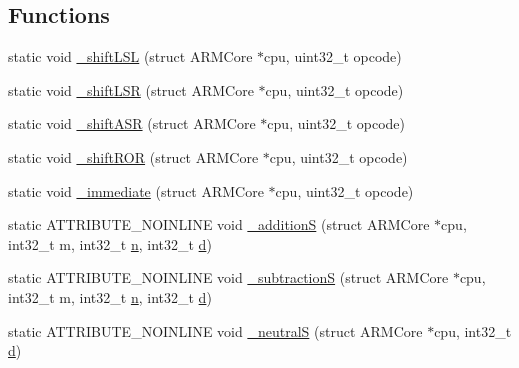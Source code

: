 \subsection*{Functions}
\begin{DoxyCompactItemize}
\item 
static void \mbox{\hyperlink{isa-arm_8c_a8d2da5536596dafb6d1b701db5ac6eca}{\+\_\+shift\+L\+SL}} (struct A\+R\+M\+Core $\ast$cpu, uint32\+\_\+t opcode)
\item 
static void \mbox{\hyperlink{isa-arm_8c_a7477c32e969303bc1b4ae8a83c64d3ac}{\+\_\+shift\+L\+SR}} (struct A\+R\+M\+Core $\ast$cpu, uint32\+\_\+t opcode)
\item 
static void \mbox{\hyperlink{isa-arm_8c_aedec32cf3d293a334f38a37b00eaeb06}{\+\_\+shift\+A\+SR}} (struct A\+R\+M\+Core $\ast$cpu, uint32\+\_\+t opcode)
\item 
static void \mbox{\hyperlink{isa-arm_8c_a7ac9fa3bbd1d0f6e309b9ece3a7f5bd3}{\+\_\+shift\+R\+OR}} (struct A\+R\+M\+Core $\ast$cpu, uint32\+\_\+t opcode)
\item 
static void \mbox{\hyperlink{isa-arm_8c_a5948ab4e0f82eb11d17504a8cc5237b7}{\+\_\+immediate}} (struct A\+R\+M\+Core $\ast$cpu, uint32\+\_\+t opcode)
\item 
static A\+T\+T\+R\+I\+B\+U\+T\+E\+\_\+\+N\+O\+I\+N\+L\+I\+NE void \mbox{\hyperlink{isa-arm_8c_aacc44c610decdc49724b9106c933f9fd}{\+\_\+additionS}} (struct A\+R\+M\+Core $\ast$cpu, int32\+\_\+t m, int32\+\_\+t \mbox{\hyperlink{isa-lr35902_8c_ae54e54065504090672c92ef62a1c5f05}{n}}, int32\+\_\+t \mbox{\hyperlink{isa-thumb_8c_a6f364afbe132c4ecfea48bde1b0618ba}{d}})
\item 
static A\+T\+T\+R\+I\+B\+U\+T\+E\+\_\+\+N\+O\+I\+N\+L\+I\+NE void \mbox{\hyperlink{isa-arm_8c_a733229f64178692c7471e6b921cfc1a1}{\+\_\+subtractionS}} (struct A\+R\+M\+Core $\ast$cpu, int32\+\_\+t m, int32\+\_\+t \mbox{\hyperlink{isa-lr35902_8c_ae54e54065504090672c92ef62a1c5f05}{n}}, int32\+\_\+t \mbox{\hyperlink{isa-thumb_8c_a6f364afbe132c4ecfea48bde1b0618ba}{d}})
\item 
static A\+T\+T\+R\+I\+B\+U\+T\+E\+\_\+\+N\+O\+I\+N\+L\+I\+NE void \mbox{\hyperlink{isa-arm_8c_a773c46d6cc7e0b7b6d527138482874df}{\+\_\+neutralS}} (struct A\+R\+M\+Core $\ast$cpu, int32\+\_\+t \mbox{\hyperlink{isa-thumb_8c_a6f364afbe132c4ecfea48bde1b0618ba}{d}})
\item 

\end{DoxyCompactItemize}
